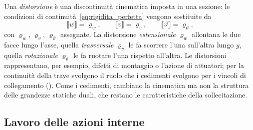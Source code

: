 Una \emph{distorsione} è una
discontinuità cinematica imposta in una sezione: le
condizioni di continuità~\eqref{eq:rigidita_perfetta}
vengono sostituite da
\begin{equation}\label{eq:distorsioni}
	\llbracket w \rrbracket = \varrho_w, \qquad
	\llbracket v \rrbracket = \varrho_v, \qquad
	\llbracket \vartheta \rrbracket = \varrho_\vartheta,
\end{equation}
con $\varrho_w$, $\varrho_v$, $\varrho_\vartheta$
assegnate.
La distorsione \emph{estensionale}
$\varrho_w$ allontana le due facce lungo l'asse, quella
\emph{trasversale}
$\varrho_v$ le fa scorrere l'una sull'altra lungo $y$,
quella \emph{rotazionale}
$\varrho_\vartheta$ le fa ruotare l'una rispetto
all'altra. Le distorsioni rappresentano, per esempio,
difetti di montaggio o l'azione di attuatori; per la
continuità della trave svolgono il ruolo che i cedimenti
svolgono per i vincoli di collegamento
(). Come i cedimenti, cambiano
la cinematica ma non la struttura delle grandezze statiche
duali, che restano le caratteristiche della sollecitazione.

\subsection{Lavoro delle azioni interne}
\label{sec:lavoro_azioni_interne}

